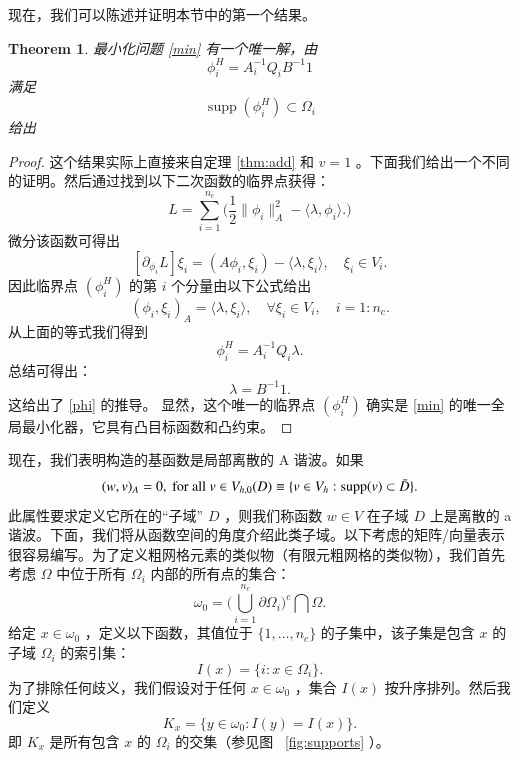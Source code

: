 \documentclass[12pt]{acta_2011xz}
\newtheorem{theorem}{Theorem}[section]
\begin{document}
现在，我们可以陈述并证明本节中的第一个结果。
   \begin{theorem}   \label{thm:theoremA}    最小化问题
   \eqref{min}    有一个唯一解，由
   \begin{equation}\label{phi}
\phi_i^H = A_i^{-1} Q_i B^{-1}1
\end{equation}    满足
   $$
\operatorname{supp}(\phi_i^H)\subset \Omega_i
$$    给出  \end{theorem}    
   \begin{proof}这个结果实际上直接来自定理    \ref{thm:add}    和    $v=1$    。下面我们给出一个不同的证明。然后通过找到以下二次函数的临界点获得：
   $$
    L = \sum_{i=1}^{n_c}\bigg(
\frac{1}{2}\|\phi_i\|_A^2 - \langle\lambda,\phi_i\rangle.
\bigg)
$$    微分该函数可得出
   $$ [{\partial_{\phi_i}} L] \xi_i = (A\phi_i,\xi_i) -
\langle\lambda,\xi_i\rangle,\quad \xi_i\in V_i.
$$    因此临界点    $(\phi_i^H)$    的第    $i$    个分量由以下公式给出
   \begin{equation}\label{crit1}
(\phi_i,\xi_i)_A = \langle\lambda, \xi_i\rangle, 
\quad\forall \xi_i\in V_i, \quad i=1:n_c.
\end{equation}    从上面的等式我们得到
   $$
\phi_i^H= A_i^{-1} Q_i \lambda. 
$$    总结可得出：
   $$
\lambda = B^{-1} 1. 
$$    这给出了    \eqref{phi}    的推导。
显然，这个唯一的临界点    $(\phi_i^H)$    确实是    \eqref{min}    的唯一全局最小化器，它具有凸目标函数和凸约束。  \end{proof}    现在，我们表明构造的基函数是局部离散的 A 谐波。如果
   $$
(w,v)_A=0,\mbox{ for all } v\in V_{h,0}(D)\equiv \{ v\in V_h: {\rm supp}(v)
\subset\bar D \} .
$$    此属性要求定义它所在的“子域”   $D$   ，则我们称函数    $w\in V$    在子域    $D$    上是离散的 a 谐波。下面，我们将从函数空间的角度介绍此类子域。以下考虑的矩阵/向量表示很容易编写。为了定义粗网格元素的类似物（有限元粗网格的类似物），我们首先考虑    $\Omega$    中位于所有    $\Omega_i$    内部的所有点的集合：
   \begin{equation*}
    \omega_0 = \bigg(\bigcup_{i=1}^{n_c}\partial\Omega_i\bigg)^c \bigcap
\Omega.
\end{equation*}    给定    $x\in\omega_0$   ，定义以下函数，其值位于    $ \{ 1,\ldots,n_c \} $    的子集中，该子集是包含    $x$    的子域
   $\Omega_i$    的索引集：
   \begin{equation}\label{Ix}
  I(x)= \{ i: x\in\Omega_i \} .
\end{equation}    为了排除任何歧义，我们假设对于任何    $x\in
\omega_0$   ，集合    $I(x)$    按升序排列。然后我们定义
   \begin{equation}\label{Kx}
K_x =  \{ y\in \omega_0: I(y)=I(x) \} .
\end{equation}    即    $K_x$    是所有包含    $x$    的    $\Omega_i$    的交集（参见图~    \ref{fig:supports}   ）。  
\end{document}
